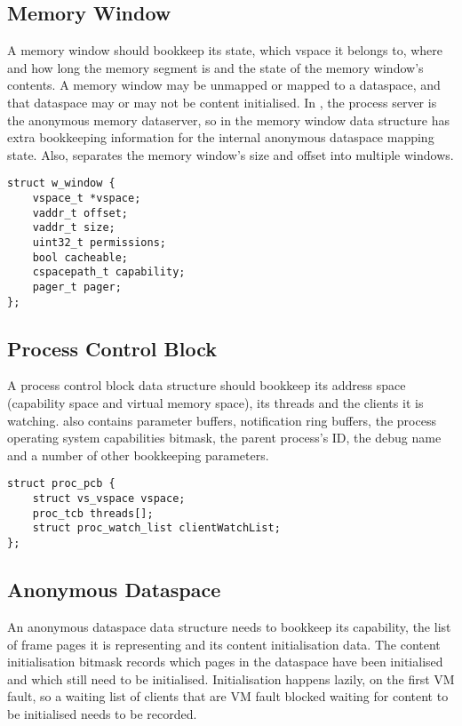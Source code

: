 \subsection {Memory Window}

A memory window should bookkeep its state, which vspace it belongs to, where and how long the memory segment is and the state of the memory window's contents. A memory window may be unmapped or mapped to a dataspace, and that dataspace may or may not be content initialised. In , the process server is the anonymous memory dataserver, so in  the memory window data structure has extra bookkeeping information for the internal anonymous dataspace mapping state. Also,  separates the memory window's size and offset into multiple windows.

\begin{verbatim}
struct w_window {
    vspace_t *vspace;
    vaddr_t offset;
    vaddr_t size;
    uint32_t permissions;
    bool cacheable;
    cspacepath_t capability;
    pager_t pager;
};
\end{verbatim}

\subsection {Process Control Block}

A process control block data structure should bookkeep its address space (capability space and virtual memory space), its threads and the clients it is watching.  also contains parameter buffers, notification ring buffers, the process operating system capabilities bitmask, the parent process's ID, the debug name and a number of other bookkeeping parameters.

\begin{verbatim}
struct proc_pcb {
    struct vs_vspace vspace;
    proc_tcb threads[];
    struct proc_watch_list clientWatchList;
};
\end{verbatim}

\subsection {Anonymous Dataspace}

An anonymous dataspace data structure needs to bookkeep its capability, the list of frame pages it is representing and its content initialisation data. The content initialisation bitmask records which pages in the dataspace have been initialised and which still need to be initialised. Initialisation happens lazily, on the first VM fault, so a waiting list of clients that are VM fault blocked waiting for content to be initialised needs to be recorded.

